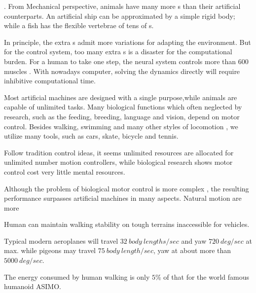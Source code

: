 \begin{itemize}
.
From Mechanical perspective, animals have many more {\dof}s than their artificial counterparts.
An artificial ship can be approximated by a simple rigid body; while a fish has the flexible vertebrae of tens of {\dof}s.


In principle, the extra {\dof}s admit more variations for adapting the environment. 
But for the control system, too many extra {\dof}s is a disaster for the computational burden. 
For a human to take one step,  the neural system controls more than $600$ muscles .
With nowadays computer, solving the dynamics directly will require inhibitive computational time.

 
Most artificial machines are designed with a single purpose,while animals are capable  of unlimited tasks.
Many biological functions which often neglected by \cms research, such as the feeding, breeding, language and vision, depend on motor control. 
Besides walking, swimming and many other styles of locomotion , we utilize many tools, such as cars, skate, bicycle and tennis.

Follow tradition control ideas, it seems unlimited resources are allocated for unlimited number motion controllers, while biological research shows motor control cost very little mental resources.

Although the problem of biological motor control is more complex , the resulting performance surpasses artificial machines in many aspects.
Natural motion are more
\begin{enumerate} 

Human can maintain walking stability on tough terrains inaccessible for vehicles.

Typical modern aeroplanes will travel $32\: body\: lengths/sec$ and yaw $720\: deg/sec$ at max.
while pigeons may travel $75 \:body\: length / sec$, yaw at about more than $5000 \: deg/sec$.

The energy consumed by human walking is only $5\%$ of that for the world famous humanoid ASIMO.
\end{enumerate}

\end{itemize}



